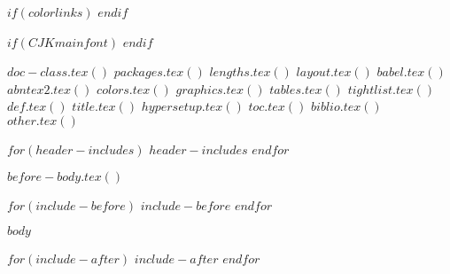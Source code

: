 





$if(colorlinks)$
$endif$

$if(CJKmainfont)$
$endif$

$doc-class.tex()$
$packages.tex()$
$lengths.tex()$
$layout.tex()$
$babel.tex()$
$abntex2.tex()$
$colors.tex()$
$graphics.tex()$
$tables.tex()$
$tightlist.tex()$
$def.tex()$
$title.tex()$
$hypersetup.tex()$
$toc.tex()$
$biblio.tex()$
$other.tex()$

$for(header-includes)$
$header-includes$
$endfor$





\pretextual

$before-body.tex()$

$for(include-before)$
$include-before$
$endfor$


\textual
$body$

$for(include-after)$
$include-after$
$endfor$


